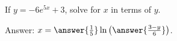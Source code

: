 \documentclass{ximera}
\author{Ivo Terek}
\begin{document}
\begin{exercise}

  If $y = -6e^{5x}+3$, solve for $x$ in terms of $y$.

  Answer: $x = \answer{\frac{1}{5}} \ln \left(\answer{\frac{3-y}{6}}\right)$.

\end{exercise}
\end{document}
